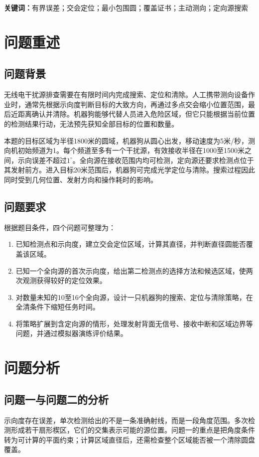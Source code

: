 \documentclass[UTF8,fontset=fandol,a4paper,zihao=-4]{ctexart}
\begin{document}
\noindent\textbf{关键词：}有界误差；交会定位；最小包围圆；覆盖证书；主动测向；定向源搜索
\newpage

\section{问题重述}
\subsection{问题背景}
无线电干扰源排查需要在有限时间内完成搜索、定位和清除。人工携带测向设备作业时，通常先根据示向度判断目标的大致方向，再通过多点交会缩小位置范围，最后近距离确认并清除。机器狗能够代替人员进入危险区域，但它只能根据当前位置的检测结果行动，无法预先获知全部目标的位置和数量。

本题的目标区域为半径1800米的圆域，机器狗从圆心出发，移动速度为5米/秒，测向机初始频道为1。每个频道至多有一个干扰源，有效接收半径在1000至1500米之间，示向误差不超过$1^\circ$。全向源在接收范围内均可检测，定向源还要求检测点位于其发射前方。进入目标20米范围后，机器狗可完成光学定位与清除。搜索过程因此同时受到几何位置、发射方向和操作耗时的影响\cite{problem}。

\subsection{问题要求}
根据题目条件，四个问题可整理为：
\begin{enumerate}
\item 已知检测点和示向度，建立交会定位区域，计算其直径，并判断直径圆能否覆盖该区域。
\item 已知一个全向源的首次示向度，给出第二检测点的选择方法和候选区域，使两次观测获得较好的定位效果。
\item 对数量未知的10至16个全向源，设计一只机器狗的搜索、定位与清除策略，在全清条件下缩短任务时间。
\item 将策略扩展到含定向源的情形，处理发射背面无信号、接收中断和区域边界等问题，并通过模拟器演练评价结果。
\end{enumerate}

\section{问题分析}
\subsection{问题一与问题二的分析}
示向度存在误差，单次检测给出的不是一条准确射线，而是一段角度范围。多次检测形成若干扇形楔区，它们的交集表示可能的源位置。问题一的重点是把角度条件转为可计算的平面约束；计算区域直径后，还需检查整个区域能否被一个清除圆盘覆盖。
\end{document}
